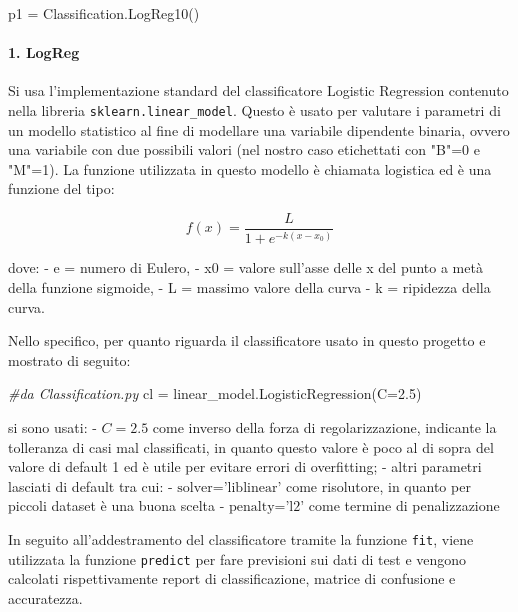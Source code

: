 \documentclass[11pt]{article}
\newenvironment{Shaded}{}{}
\newcommand{\FloatTok}[1]{\textcolor[rgb]{0.25,0.63,0.44}{{#1}}}
\newcommand{\CommentTok}[1]{\textcolor[rgb]{0.38,0.63,0.69}{\textit{{#1}}}}
\newcommand{\NormalTok}[1]{{#1}}
\newcommand{\OperatorTok}[1]{\textcolor[rgb]{0.40,0.40,0.40}{{#1}}}
\begin{document}
\begin{Shaded}
\begin{Highlighting}[]
\NormalTok{p1 }\OperatorTok{=}\NormalTok{ Classification.LogReg10()}
\end{Highlighting}
\end{Shaded}

    \paragraph{1. LogReg}\label{logreg}

    Si usa l'implementazione standard del classificatore Logistic Regression
contenuto nella libreria \texttt{sklearn.linear\_model}. Questo è usato
per valutare i parametri di un modello statistico al fine di modellare
una variabile dipendente binaria, ovvero una variabile con due possibili
valori (nel nostro caso etichettati con "B"=0 e "M"=1). La funzione
utilizzata in questo modello è chiamata logistica ed è una funzione del
tipo:

\begin{equation*}
f(x)={\frac {L}{1+e^{-k(x-x_{0})}}}
\end{equation*}

dove: - e = numero di Eulero, - x0 = valore sull'asse delle x del punto
a metà della funzione sigmoide, - L = massimo valore della curva - k =
ripidezza della curva.

Nello specifico, per quanto riguarda il classificatore usato in questo
progetto e mostrato di seguito:

\begin{Shaded}
\begin{Highlighting}[]
\CommentTok{#da Classification.py}
\NormalTok{cl }\OperatorTok{=}\NormalTok{ linear_model.LogisticRegression(C}\OperatorTok{=}\FloatTok{2.5}\NormalTok{)}
\end{Highlighting}
\end{Shaded}

si sono usati: - \(C=2.5\) come inverso della forza di regolarizzazione,
indicante la tolleranza di casi mal classificati, in quanto questo
valore è poco al di sopra del valore di default 1 ed è utile per evitare
errori di overfitting; - altri parametri lasciati di default tra cui: -
\(\text{solver='liblinear'}\) come risolutore, in quanto per piccoli
dataset è una buona scelta - \(\text{penalty='l2'}\) come termine di
penalizzazione

In seguito all'addestramento del classificatore tramite la funzione
\texttt{fit}, viene utilizzata la funzione \texttt{predict} per fare
previsioni sui dati di test e vengono calcolati rispettivamente report
di classificazione, matrice di confusione e accuratezza.
\end{document}
